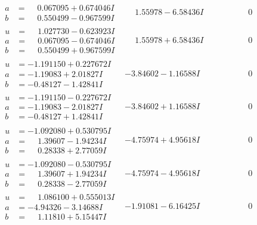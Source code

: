 \documentclass[1p]{elsarticle_modified}
\theoremstyle{definition}
\begin{document}
$$\begin{array}{c|c|c}
\begin{aligned}
a &= \phantom{-}0.067095 + 0.674046 I \\
b &= \phantom{-}0.550499 - 0.967599 I\end{aligned}
 & \phantom{-}1.55978 - 6.58436 I & \phantom{-0.000000 } 0 \\ \hline\begin{aligned}
u &= \phantom{-}1.027730 - 0.623923 I \\
a &= \phantom{-}0.067095 - 0.674046 I \\
b &= \phantom{-}0.550499 + 0.967599 I\end{aligned}
 & \phantom{-}1.55978 + 6.58436 I & \phantom{-0.000000 } 0 \\ \hline\begin{aligned}
u &= -1.191150 + 0.227672 I \\
a &= -1.19083 + 2.01827 I \\
b &= -0.48127 - 1.42841 I\end{aligned}
 & -3.84602 - 1.16588 I & \phantom{-0.000000 } 0 \\ \hline\begin{aligned}
u &= -1.191150 - 0.227672 I \\
a &= -1.19083 - 2.01827 I \\
b &= -0.48127 + 1.42841 I\end{aligned}
 & -3.84602 + 1.16588 I & \phantom{-0.000000 } 0 \\ \hline\begin{aligned}
u &= -1.092080 + 0.530795 I \\
a &= \phantom{-}1.39607 - 1.94234 I \\
b &= \phantom{-}0.28338 + 2.77059 I\end{aligned}
 & -4.75974 + 4.95618 I & \phantom{-0.000000 } 0 \\ \hline\begin{aligned}
u &= -1.092080 - 0.530795 I \\
a &= \phantom{-}1.39607 + 1.94234 I \\
b &= \phantom{-}0.28338 - 2.77059 I\end{aligned}
 & -4.75974 - 4.95618 I & \phantom{-0.000000 } 0 \\ \hline\begin{aligned}
u &= \phantom{-}1.086100 + 0.555013 I \\
a &= -4.94326 - 3.14688 I \\
b &= \phantom{-}1.11810 + 5.15447 I\end{aligned}
 & -1.91081 - 6.16425 I & \phantom{-0.000000 } 0\\

\end{array}$$
\end{document}
